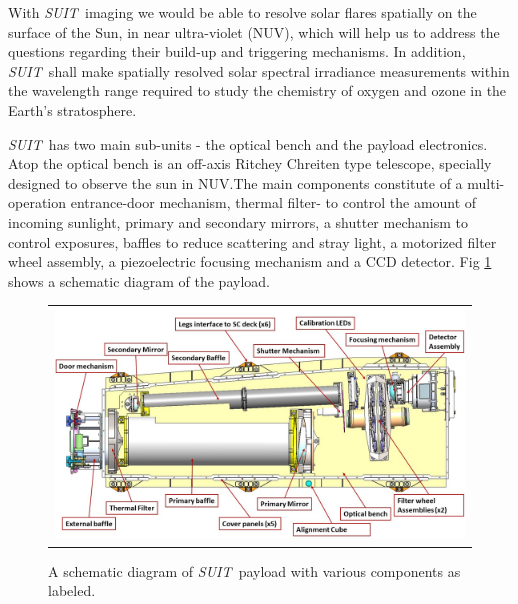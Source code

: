 \documentclass[12pt]{spieman}  %
\newcommand{\suit}{{\it SUIT~}}
\begin{document}
 With \suit imaging we would be able to resolve solar flares spatially on the surface of the Sun, in near ultra-violet (NUV), which will help us to address the questions regarding their build-up and triggering mechanisms. In addition, \suit shall make spatially resolved solar spectral irradiance measurements within the wavelength range required to study the chemistry of oxygen and ozone in the Earth's stratosphere.

\suit has two main sub-units - the optical bench and the payload electronics. Atop the optical bench is an off-axis Ritchey Chreiten type telescope, specially designed to observe the sun in NUV.The main components constitute of a multi-operation entrance-door mechanism, thermal filter- to control the amount of incoming sunlight, primary and secondary mirrors, a shutter mechanism to control exposures, baffles to reduce scattering and stray light, a motorized filter wheel assembly, a piezoelectric focusing mechanism and a CCD detector. Fig \ref{fig:suit} shows a schematic diagram of the payload.

\begin{figure}[ht!]
\begin{center}
\begin{tabular}{c}
\includegraphics[width=0.8\linewidth]{SUITLayout.jpg}
\end{tabular}
\end{center}
\caption 
{ \label{fig:suit} A schematic diagram of \suit payload with various components as labeled. } 
\end{figure} 
\end{document}
